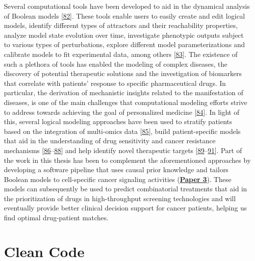 \documentclass[
  12pt,
]{book}
\begin{document}
Several computational tools have been developed to aid in the dynamical analysis of Boolean models {[}\protect\hyperlink{ref-Abou-Jaoude2016}{82}{]}.
These tools enable users to easily create and edit logical models, identify different types of attractors and their reachability properties, analyze model state evolution over time, investigate phenotypic outputs subject to various types of perturbations, explore different model parameterizations and calibrate models to fit experimental data, among others {[}\protect\hyperlink{ref-Naldi2018a}{83}{]}.
The existence of such a plethora of tools has enabled the modeling of complex diseases, the discovery of potential therapeutic solutions and the investigation of biomarkers that correlate with patients' response to specific pharmaceutical drugs.
In particular, the derivation of mechanistic insights related to the manifestation of diseases, is one of the main challenges that computational modeling efforts strive to address towards achieving the goal of personalized medicine {[}\protect\hyperlink{ref-Hood2011}{84}{]}.
In light of this, several logical modeling approaches have been used to stratify patients based on the integration of multi-omics data {[}\protect\hyperlink{ref-Beal2018}{85}{]}, build patient-specific models that aid in the understanding of drug sensitivity and cancer resistance mechanisms {[}\protect\hyperlink{ref-Eduati2017}{86}--\protect\hyperlink{ref-Tognetti2021}{88}{]} and help identify novel therapeutic targets {[}\protect\hyperlink{ref-Saadatpour2011}{89}--\protect\hyperlink{ref-Eduati2020}{91}{]}.
Part of the work in this thesis has been to complement the aforementioned approaches by developing a software pipeline that uses causal prior knowledge and tailors Boolean models to cell-specific cancer signaling activities (\textbf{\protect\hyperlink{Paper3}{Paper 3}}).
These models can subsequently be used to predict combinatorial treatments that aid in the prioritization of drugs in high-throughput screening technologies and will eventually provide better clinical decision support for cancer patients, helping us find optimal drug-patient matches.

\newpage

\hypertarget{clean-code}{%
\section*{Clean Code}\label{clean-code}}

\indent
\end{document}

